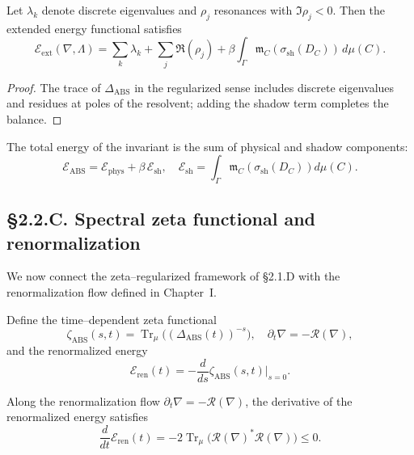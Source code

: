 \begin{theorem}\label{thm:2.2.resenergy}
Let $\lambda_k$ denote discrete eigenvalues and $\rho_j$ resonances with $\Im \rho_j<0$.  
Then the extended energy functional satisfies
\[
\mathcal{E}_{\mathrm{ext}}(\nabla,\Lambda)
=\sum_k \lambda_k
 +\sum_j \Re(\rho_j)
 +\beta\int_\Gamma \mathfrak m_C(\sigma_{\mathrm{sh}}(D_C))\,d\mu(C).
\]
\end{theorem}

\begin{proof}
The trace of $\Delta_{\mathrm{ABS}}$ in the regularized sense includes discrete eigenvalues and residues at poles of the resolvent; adding the shadow term completes the balance.
\end{proof}

\begin{corollary}
The total energy of the invariant is the sum of physical and shadow components:
\[
\mathcal{E}_{\mathrm{ABS}}
 = \mathcal{E}_{\mathrm{phys}} + \beta\,\mathcal{E}_{\mathrm{sh}},
\quad
\mathcal{E}_{\mathrm{sh}} = 
\int_\Gamma \mathfrak m_C(\sigma_{\mathrm{sh}}(D_C))d\mu(C).
\]
\end{corollary}

\subsection*{§2.2.C. Spectral zeta functional and renormalization}

We now connect the zeta–regularized framework of §2.1.D with the renormalization flow defined in Chapter~I.

\begin{definition}
Define the time–dependent zeta functional
\[
\zeta_{\mathrm{ABS}}(s,t)
= \operatorname{Tr}_\mu\big((\Delta_{\mathrm{ABS}}(t))^{-s}\big),
\quad
\partial_t\nabla = -\mathcal{R}(\nabla),
\]
and the renormalized energy
\[
\mathcal{E}_{\mathrm{ren}}(t)
= -\frac{d}{ds}\zeta_{\mathrm{ABS}}(s,t)\big|_{s=0}.
\]
\end{definition}

\begin{theorem}\label{thm:2.2.mono}
Along the renormalization flow $\partial_t\nabla=-\mathcal{R}(\nabla)$, 
the derivative of the renormalized energy satisfies
\[
\frac{d}{dt}\mathcal{E}_{\mathrm{ren}}(t)
=-2\operatorname{Tr}_\mu\big(\mathcal{R}(\nabla)^\ast\mathcal{R}(\nabla)\big)
\le0.
\]
\end{theorem}

